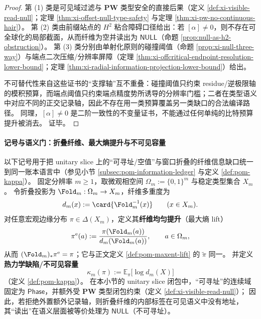 \begin{proof}
第 (1) 类是可见域过滤与 \(\mathbf{PW}\) 类型安全的直接后果（定义 \ref{def:xi-visible-read-null}；定理 \ref{thm:xi-offset-null-type-safety} 与定理 \ref{thm:xi-pw-no-continuous-hair}）。
第 (2) 类由前缀站点的 \(H^2\) 粘合障碍口径给出：若 \([\alpha]\neq 0\)，则不存在可全球化的局部截面，从而纤维为空并读出为 \(\mathsf{NULL}\)（命题 \ref{prop:null-as-h2-obstruction}）。
第 (3) 类分别由单射化原则的碰撞阈值（命题 \ref{prop:xi-null-three-way}）与端点二次压缩/分辨率屏障（定理 \ref{thm:xi-offcritical-endpoint-resolution-lower-bound}；定理 \ref{thm:xi-radial-information-projection-lower-bound}）给出。
\par
不可替代性来自这些证书的“支撑轴”互不重叠：碰撞阈值只约束 residue/逆极限轴的模积预算，而端点阈值只约束端点精度势所诱导的分辨率门槛；二者在类型语义中对应不同的正交记录轴，因此不存在用一类预算覆盖另一类缺口的合法编译路径。
同理，\([\alpha]\neq 0\) 是二阶一致性的不变量证书，不能通过任何单纯的比特预算提升被消去。
证毕。
\end{proof}





\paragraph{记号与语义门：折叠纤维、最大熵提升与不可见容量}\label{par:xi-null-notation-semantic-gate}
以下记号用于把 unitary slice 上的“可寻址/空值”与窗口折叠的纤维信息缺口统一到同一账本语言中（参见小节 \ref{subsec:pom-information-ledger} 与定义 \ref{def:pom-kappa}）。
固定分辨率 \(m\ge 1\)，取微观相空间 \(\Omega_m:=\{0,1\}^m\) 与稳定类型集合 \(X_m\)。
令折叠投影为 \(\Fold_m:\Omega_m\to X_m\)，纤维多重度为
\[
d_m(x):=\card{\Fold_m^{-1}(x)}\qquad(x\in X_m).
\]
对任意宏观边缘分布 \(\pi\in\Delta(X_m)\)，定义其\textbf{纤维均匀提升}（最大熵 lift）
\begin{equation}\label{eq:xi-null-maxent-lift}
\pi^{\mathrm{e}}(a):=\frac{\pi(\Fold_m(a))}{d_m(\Fold_m(a))},\qquad a\in\Omega_m,
\end{equation}
从而 \((\Fold_m)_*\pi^{\mathrm{e}}=\pi\)；它与正文定义 \ref{def:pom-maxent-lift} 的 \(\widetilde\pi\) 同一。
并定义\textbf{热力学缺陷/不可见容量}
\[
\kappa_m(\pi):=\mathbb{E}_{\pi}\bigl[\log d_m(X)\bigr]
\]
（定义 \ref{def:pom-kappa}）。
在本小节的 unitary slice 闭包中，“可寻址”的连续域固定为 \(\mathsf{Phase}\)，并额外受 \(\mathbf{PW}\) 类型闭包约束（定义 \ref{def:xi-visible-read-null}）；
因此，若拒绝外置额外记录轴，则折叠纤维的内部标签在可见语义中没有地址，其“读出”在语义层面被等价处理为 \(\mathsf{NULL}\)（不可寻址）。

